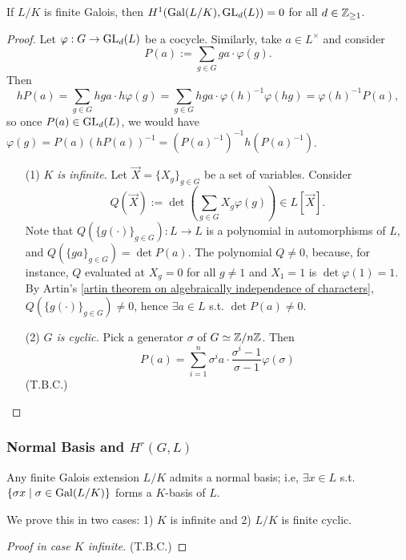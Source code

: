 \begin{theorem}[Hilbert 90]\label{Hilbert 90 - H1(Gal GL) = 0}
    If $L/K$ is finite Galois, then $H^1(\operatorname{Gal}(L/K), \operatorname{GL}_d(L)) = 0$ for all $d\in\mathbb{Z}_{\ge 1}$.
\end{theorem}
\begin{proof}
    Let $\varphi : G\to \operatorname{GL}_d(L)$ be a cocycle.
    Similarly, take $a\in L^\times$ and consider \[P(a) := \sum_{g\in G} ga\cdot \varphi(g).\]
    Then \[hP(a) = \sum_{g\in G} hga\cdot h\varphi(g)
    = \sum_{g\in G} hga\cdot \varphi(h)^{-1}\varphi(hg) = \varphi(h)^{-1}P(a),\]
    so once $P(a)\in \operatorname{GL}_d(L)$,
    we would have $\varphi(g) = P(a)\left( hP(a ) \right)^{-1} = \left( P(a)^{-1} \right)^{-1}h(P(a)^{-1})$.
\begin{enumerate}
    \item [(1)] \textit{$K$ is infinite.}
    Let $\vec{X} = \{X_g\}_{g\in G}$ be a set of variables. Consider \[
    Q(\vec{X}) := \det\left( \sum_{g\in G}X_g\varphi(g) \right)\in L[\vec{X}].\]
    Note that $Q(\{g(\cdot )\}_{g\in G}) : L\to L$ is a polynomial in automorphisms of $L$, and $Q(\{ga\}_{g\in G}) = \det P(a)$.
    The polynomial $Q\ne 0$, because, for instance,
    $Q$ evaluated at $X_g = 0$ for all $g\ne 1$ and $X_1 = 1$ is
    $\det \varphi(1) = 1$.
    By Artin's \cref{artin theorem on algebraically independence of characters},
    $Q(\{g(\cdot )\}_{g\in G})\ne 0$, hence $\exists a\in L$ s.t. $\det P(a)\ne 0$.

    \item [(2)] \textit{$G$ is cyclic.}
    Pick a generator $\sigma$ of $G\simeq\mathbb{Z}/n\mathbb{Z}$.
    Then \[P(a) = \sum_{i=1}^{n}\sigma^ia\cdot \frac{\sigma^i-1}{\sigma - 1}\varphi(\sigma)\]
    (T.B.C.)
\end{enumerate}
\end{proof}

\subsubsection{Normal Basis and \texorpdfstring{$H^r(G, L)$}{Hr(G, L)}}

\begin{theorem}\label{normal basis theorem for finite galois}
    Any finite Galois extension $L/K$ admits a normal basis; i.e, $\exists x\in L$ s.t. $\{\sigma x\mid \sigma\in\operatorname{Gal}(L/K)\}$ forms a $K$-basis of $L$.
\end{theorem}
We prove this in two cases: 1) $K$ is infinite
and 2) $L/K$ is finite cyclic.
\begin{proof}[Proof in case $K$ infinite]
    (T.B.C.)
\end{proof}

